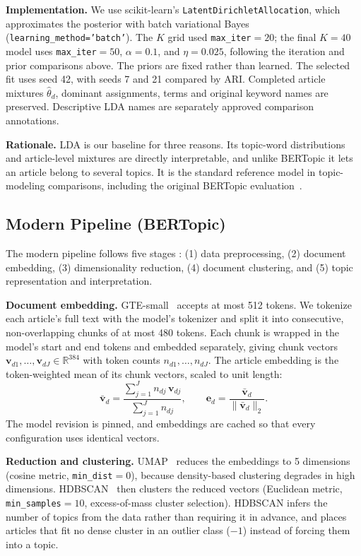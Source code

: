 \documentclass[conference]{IEEEtran}
\begin{document}
\textbf{Implementation.} We use scikit-learn's \texttt{LatentDirichletAllocation}, which approximates the posterior with batch variational Bayes (\texttt{learning\_method='batch'}). The $K$ grid used \texttt{max\_iter}$=20$; the final $K=40$ model uses \texttt{max\_iter}$=50$, $\alpha=0.1$, and $\eta=0.025$, following the iteration and prior comparisons above. The priors are fixed rather than learned. The selected fit uses seed 42, with seeds 7 and 21 compared by ARI. Completed article mixtures $\hat{\theta}_d$, dominant assignments, terms and original keyword names are preserved. Descriptive LDA names are separately approved comparison annotations.

\textbf{Rationale.} LDA is our baseline for three reasons. Its topic-word distributions and article-level mixtures are directly interpretable, and unlike BERTopic it lets an article belong to several topics. It is the standard reference model in topic-modeling comparisons, including the original BERTopic evaluation~\cite{grootendorst2022bertopic}. 

\subsection*{Modern Pipeline (BERTopic)}
The modern pipeline follows five stages \cite{alammar2024, kumari2026}: (1) data preprocessing, (2) document embedding, (3) dimensionality reduction, (4) document clustering, and (5) topic representation and interpretation.

\textbf{Document embedding.} GTE-small~\cite{li2023gte} accepts at most 512 tokens. We tokenize each article's full text with the model's tokenizer and split it into consecutive, non-overlapping chunks of at most 480 tokens. Each chunk is wrapped in the model's start and end tokens and embedded separately, giving chunk vectors $\mathbf{v}_{d1},\dots,\mathbf{v}_{dJ}\in\mathbb{R}^{384}$ with token counts $n_{d1},\dots,n_{dJ}$. The article embedding is the token-weighted mean of its chunk vectors, scaled to unit length:
\begin{equation}
\bar{\mathbf{v}}_d = \frac{\sum_{j=1}^{J} n_{dj}\,\mathbf{v}_{dj}}{\sum_{j=1}^{J} n_{dj}}, \qquad
\mathbf{e}_d = \frac{\bar{\mathbf{v}}_d}{\lVert\bar{\mathbf{v}}_d\rVert_2}.
\label{eq:pooling}
\end{equation}
The model revision is pinned, and embeddings are cached so that every configuration uses identical vectors.

\textbf{Reduction and clustering.} UMAP~\cite{mcinnes2018umap} reduces the embeddings to 5 dimensions (cosine metric, \texttt{min\_dist}$=0$), because density-based clustering degrades in high dimensions. HDBSCAN~\cite{campello2013hdbscan} then clusters the reduced vectors (Euclidean metric, \texttt{min\_samples}$=10$, excess-of-mass cluster selection). HDBSCAN infers the number of topics from the data rather than requiring it in advance, and places articles that fit no dense cluster in an outlier class ($-1$) instead of forcing them into a topic.
\end{document}

